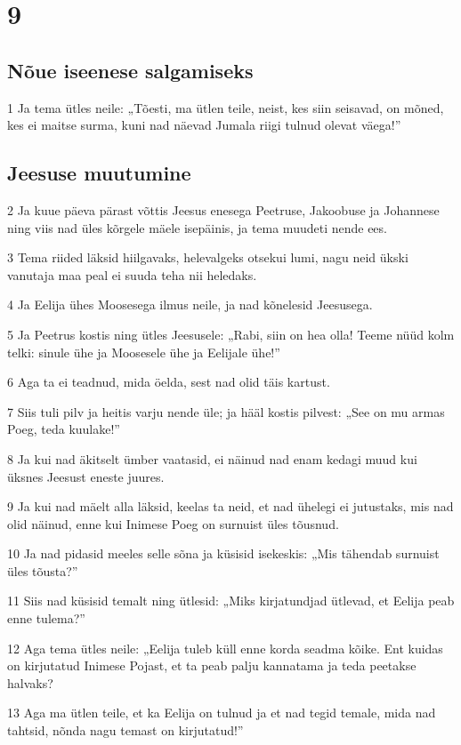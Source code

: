 \chapter{9}

\section*{Nõue iseenese salgamiseks}

\par 1 Ja tema ütles neile: „Tõesti, ma ütlen teile, neist, kes siin seisavad, on mõned, kes ei maitse surma, kuni nad näevad Jumala riigi tulnud olevat väega!”

\section*{Jeesuse muutumine}

\par 2 Ja kuue päeva pärast võttis Jeesus enesega Peetruse, Jakoobuse ja Johannese ning viis nad üles kõrgele mäele isepäinis, ja tema muudeti nende ees.
\par 3 Tema riided läksid hiilgavaks, helevalgeks otsekui lumi, nagu neid ükski vanutaja maa peal ei suuda teha nii heledaks.
\par 4 Ja Eelija ühes Moosesega ilmus neile, ja nad kõnelesid Jeesusega.
\par 5 Ja Peetrus kostis ning ütles Jeesusele: „Rabi, siin on hea olla! Teeme nüüd kolm telki: sinule ühe ja Moosesele ühe ja Eelijale ühe!”
\par 6 Aga ta ei teadnud, mida öelda, sest nad olid täis kartust.
\par 7 Siis tuli pilv ja heitis varju nende üle; ja hääl kostis pilvest: „See on mu armas Poeg, teda kuulake!”
\par 8 Ja kui nad äkitselt ümber vaatasid, ei näinud nad enam kedagi muud kui üksnes Jeesust eneste juures.
\par 9 Ja kui nad mäelt alla läksid, keelas ta neid, et nad ühelegi ei jutustaks, mis nad olid näinud, enne kui Inimese Poeg on surnuist üles tõusnud.
\par 10 Ja nad pidasid meeles selle sõna ja küsisid isekeskis: „Mis tähendab surnuist üles tõusta?”
\par 11 Siis nad küsisid temalt ning ütlesid: „Miks kirjatundjad ütlevad, et Eelija peab enne tulema?”
\par 12 Aga tema ütles neile: „Eelija tuleb küll enne korda seadma kõike. Ent kuidas on kirjutatud Inimese Pojast, et ta peab palju kannatama ja teda peetakse halvaks?
\par 13 Aga ma ütlen teile, et ka Eelija on tulnud ja et nad tegid temale, mida nad tahtsid, nõnda nagu temast on kirjutatud!”

